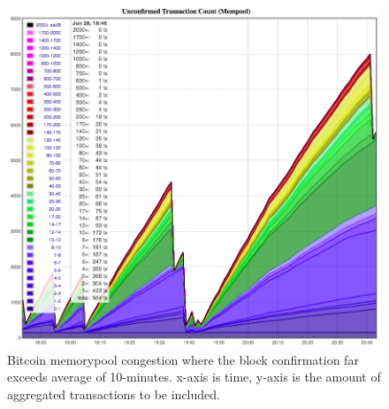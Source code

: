 \begin{figure}[h]
\centering
\includegraphics[width=1\textwidth]{images/block_time_anomalies.png}
\caption{Bitcoin memorypool congestion where the block confirmation far exceeds average of 10-minutes. x-axis is time, y-axis is the amount of aggregated transactions to be included.}
\end{figure}

